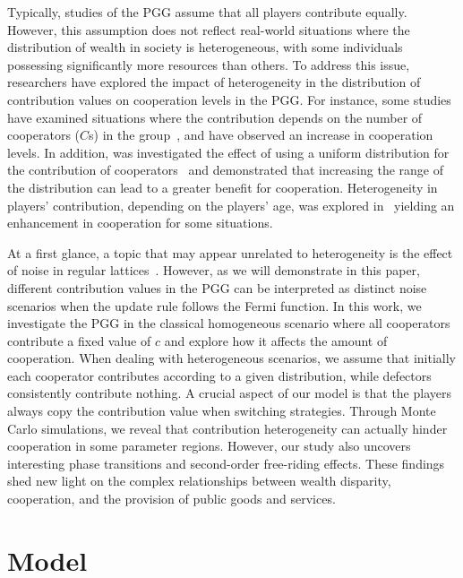 \documentclass[twocolumn,aps,amsmath,pre,floatfix,superscriptaddress]{revtex4-2}
\begin{document}
Typically, studies of the PGG assume that all players contribute equally. However, this assumption does not reflect real-world situations where the distribution of wealth in society is heterogeneous, with some individuals possessing significantly more resources than others.
%
To address this issue, researchers have explored the impact of heterogeneity in the distribution of contribution values on cooperation levels in the PGG. For instance, some studies have examined situations where the contribution depends on the number of cooperators ($C$s) in the group~\cite{wang2018heterogeneous, yuan2014role}, and have observed an increase in cooperation levels.
%
In addition, was investigated the effect of using a uniform distribution for the contribution of cooperators~\cite{huang2015effect} and  demonstrated that increasing the range of the distribution can lead to a greater benefit for cooperation.
%
Heterogeneity in players' contribution, depending on the players' age, was explored in~\cite{TIAN201365} yielding an enhancement in cooperation for some situations.

At a first glance, a topic that may appear unrelated to heterogeneity is the effect of noise in regular lattices~\cite{Szolnoki_2009,Szab__2005, Vukov_2006}. However, as we will demonstrate in this paper, different contribution values in the PGG can be interpreted as distinct noise scenarios when the update rule follows the Fermi function. 
%
In this work, we investigate the PGG in the classical homogeneous scenario where all cooperators contribute a fixed  value of $c$ and  explore how it affects the amount of cooperation. When dealing with heterogeneous scenarios, we assume that initially each cooperator contributes according to a given distribution, while defectors consistently contribute nothing. A crucial aspect of our model is that the players always copy the contribution value when switching strategies.
% 
Through Monte Carlo simulations,  we reveal that contribution heterogeneity can actually hinder cooperation in some parameter regions. However, our study also uncovers interesting phase transitions and second-order free-riding effects.  These findings shed new light on the complex relationships between wealth disparity, cooperation, and the provision of public goods and services.


\section{Model} 
\label{model}
\end{document}
